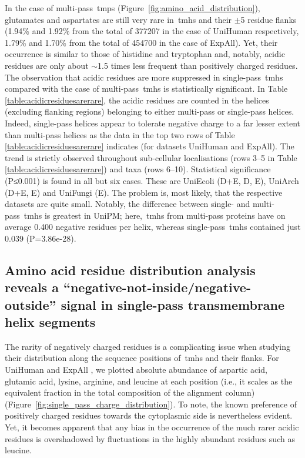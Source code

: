 In the case of multi-pass~\gls{tmp}s (Figure~\ref{fig:amino_acid_distribution}), glutamates and aspartates are still very rare in~\gls{tmh}s and their $\pm$5 residue flanks (1.94\% and 1.92\% from the total of 377207 in the case of UniHuman respectively, 1.79\% and 1.70\% from the total of 454700 in the case of ExpAll).
Yet, their occurrence is similar to those of histidine and tryptophan and, notably, acidic residues are only about $\sim$1.5 times less frequent than positively charged residues.
The observation that acidic residues are more suppressed in single-pass~\gls{tmh}s compared with the case of multi-pass~\gls{tmh}s is statistically significant.
In Table \ref{table:acidicresiduesarerare}, the acidic residues are counted in the helices (excluding flanking regions) belonging to either multi-pass or single-pass helices.
Indeed, single-pass helices appear to tolerate negative charge to a far lesser extent than multi-pass helices as the data in the top two rows of Table \ref{table:acidicresiduesarerare} indicates (for datasets UniHuman and ExpAll).
The trend is strictly observed throughout sub-cellular localisations (rows 3--5 in Table \ref{table:acidicresiduesarerare}) and taxa (rows 6--10).
Statistical significance (P≤0.001) is found in all but six cases.
These are UniEcoli (D+E, D, E), UniArch (D+E, E) and UniFungi (E).
The problem is, most likely, that the respective datasets are quite small.
Notably, the difference between single- and multi-pass~\gls{tmh}s is greatest in UniPM\@; here,~\gls{tmh}s from multi-pass proteins have on average 0.400 negative residues per helix, whereas single-pass~\gls{tmh}s contained just 0.039 (P=3.86e-28).

\subsection{Amino acid residue distribution analysis reveals a ``negative-not-inside/negative-outside'' signal in single-pass transmembrane helix segments}

The rarity of negatively charged residues is a complicating issue when studying their distribution along the sequence positions of~\gls{tmh}s and their flanks.
For UniHuman and ExpAll , we plotted absolute abundance of aspartic acid, glutamic acid, lysine, arginine, and leucine at each position (i.e., it scales as the equivalent fraction in the total composition of the alignment column) (Figure~\ref{fig:single_pass_charge_distribution}).
To note, the known preference of positively charged residues towards the cytoplasmic side is nevertheless evident.
Yet, it becomes apparent that any bias in the occurrence of the much rarer acidic residues is overshadowed by fluctuations in the highly abundant residues such as leucine.

